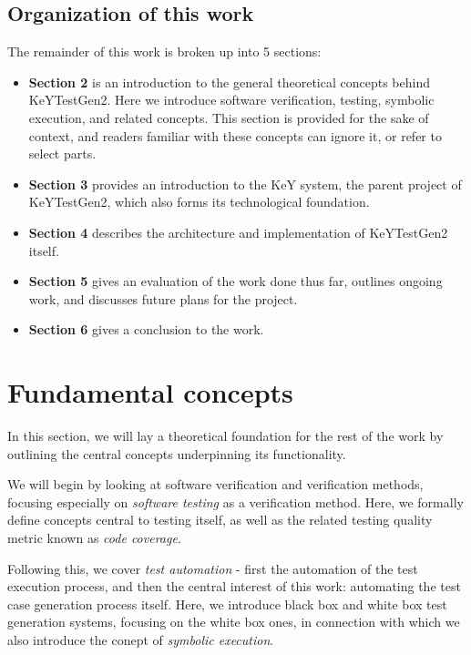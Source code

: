 \documentclass{article}
\newcommand{\tmem}[1]{{\em #1\/}}
\newcommand{\tmstrong}[1]{\textbf{#1}}
\newenvironment{itemizedot}{\begin{itemize} \renewcommand{\labelitemi}{$\bullet$}\renewcommand{\labelitemii}{$\bullet$}\renewcommand{\labelitemiii}{$\bullet$}\renewcommand{\labelitemiv}{$\bullet$}}{\end{itemize}}
\begin{document}
\subsection{Organization of this work}

The remainder of this work is broken up into 5 sections:
\begin{itemizedot}
  \item {\tmstrong{Section 2}} is an introduction to the general theoretical
  concepts behind KeYTestGen2. Here we introduce software verification,
  testing, symbolic execution, and related concepts. This section is provided
  for the sake of context, and readers familiar with these concepts can ignore
  it, or refer to select parts.
  
  \item {\tmstrong{Section 3 }}provides an introduction to the KeY system, the
  parent project of KeYTestGen2, which also forms its technological
  foundation.
  
  \item {\tmstrong{Section 4}} describes the architecture and implementation
  of KeYTestGen2 itself.
  
  \item {\tmstrong{Section 5}} gives an evaluation of the work done thus far,
  outlines ongoing work, and discusses future plans for the project.
  
  \item {\tmstrong{Section 6}} gives a conclusion to the work.
\end{itemizedot}
\section{Fundamental concepts}

In this section, we will lay a theoretical foundation for the rest of the work
by outlining the central concepts underpinning its functionality.



We will begin by looking at software verification and verification methods,
focusing especially on {\tmem{software testing}} as a verification method.
Here, we formally define concepts central to testing itself, as well as the
related testing quality metric known as {\tmem{code coverage}}.



Following this, we cover {\tmem{test automation}} - first the automation of
the test execution process, and then the central interest of this work:
automating the test case generation process itself. Here, we introduce black
box and white box test generation systems, focusing on the white box ones, in
connection with which we also introduce the conept of {\tmem{symbolic
execution}}.
\end{document}
